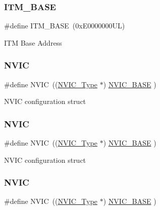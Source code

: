 \subsubsection{\texorpdfstring{ITM\_BASE}{ITM\_BASE}\hspace{0.1cm}{\footnotesize\ttfamily [3/3]}}
{\footnotesize\ttfamily \#define I\+T\+M\+\_\+\+B\+A\+SE~(0x\+E0000000\+U\+L)}

I\+TM Base Address \mbox{\label{group___c_m_s_i_s__core__base_gac8e97e8ce56ae9f57da1363a937f8a17}} 
\subsubsection{\texorpdfstring{NVIC}{NVIC}\hspace{0.1cm}{\footnotesize\ttfamily [1/6]}}
{\footnotesize\ttfamily \#define N\+V\+IC~((\mbox{\hyperlink{struct_n_v_i_c___type}{N\+V\+I\+C\+\_\+\+Type}}      $\ast$)     \mbox{\hyperlink{group___c_m_s_i_s__core__base_gaa0288691785a5f868238e0468b39523d}{N\+V\+I\+C\+\_\+\+B\+A\+SE}}     )}

N\+V\+IC configuration struct \mbox{\label{group___c_m_s_i_s__core__base_gac8e97e8ce56ae9f57da1363a937f8a17}} 
\subsubsection{\texorpdfstring{NVIC}{NVIC}\hspace{0.1cm}{\footnotesize\ttfamily [2/6]}}
{\footnotesize\ttfamily \#define N\+V\+IC~((\mbox{\hyperlink{struct_n_v_i_c___type}{N\+V\+I\+C\+\_\+\+Type}}      $\ast$)     \mbox{\hyperlink{group___c_m_s_i_s__core__base_gaa0288691785a5f868238e0468b39523d}{N\+V\+I\+C\+\_\+\+B\+A\+SE}}     )}

N\+V\+IC configuration struct \mbox{\label{group___c_m_s_i_s__core__base_gac8e97e8ce56ae9f57da1363a937f8a17}} 
\subsubsection{\texorpdfstring{NVIC}{NVIC}\hspace{0.1cm}{\footnotesize\ttfamily [3/6]}}
{\footnotesize\ttfamily \#define N\+V\+IC~((\mbox{\hyperlink{struct_n_v_i_c___type}{N\+V\+I\+C\+\_\+\+Type}}      $\ast$)     \mbox{\hyperlink{group___c_m_s_i_s__core__base_gaa0288691785a5f868238e0468b39523d}{N\+V\+I\+C\+\_\+\+B\+A\+SE}}     )}

